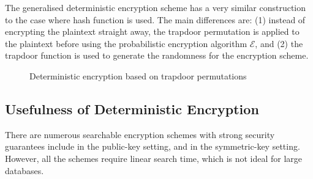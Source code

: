 \documentclass[10pt]{book}
\begin{document}
The generalised deterministic encryption scheme has a very similar construction to the case where hash function is used. The main differences are: (1) instead of encrypting the plaintext straight away, the trapdoor permutation is applied to the plaintext before using the probabilistic encryption algorithm $\mathcal{E}$, and (2) the trapdoor function is used to generate the randomness for the encryption scheme.

\begin{figure}
\begin{pchstack}[center]
	
	\pchspace
	
	
	\pchspace
	
\end{pchstack}

\caption{Deterministic encryption based on trapdoor permutations}
\end{figure}



\subsection{Usefulness of Deterministic Encryption}
There are numerous searchable encryption schemes with strong security guarantees include \cite{Boneh2004, Golle2004, Abdalla2005, Baek2008, Boyen2006, Boneh2007} in the public-key setting, and \cite{Song:2000:PTS:882494.884426, goh03, Chang2005} in the symmetric-key setting. However, all the schemes require linear search time, which is not ideal for large databases.
\end{document}
